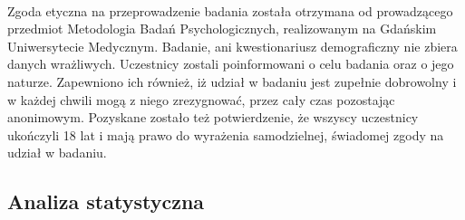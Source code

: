 \documentclass[12pt,a4paper,final,oneside,onecolumn,titlepage]{article}
\begin{document}
\paragraph{}
Zgoda etyczna na przeprowadzenie badania została otrzymana od prowadzącego przedmiot Metodologia Badań Psychologicznych, realizowanym na Gdańskim Uniwersytecie Medycznym. Badanie, ani kwestionariusz demograficzny nie zbiera danych wrażliwych. Uczestnicy zostali poinformowani o celu badania oraz o jego naturze. Zapewniono ich również, iż udział w badaniu jest zupełnie dobrowolny i w każdej chwili mogą z niego zrezygnować, przez cały czas pozostając anonimowym. Pozyskane zostało też potwierdzenie, że wszyscy uczestnicy ukończyli 18 lat i mają prawo do wyrażenia samodzielnej, świadomej zgody na udział w badaniu. 
\subsection*{\normalsize{\textbf{Analiza statystyczna}}}
\end{document}
